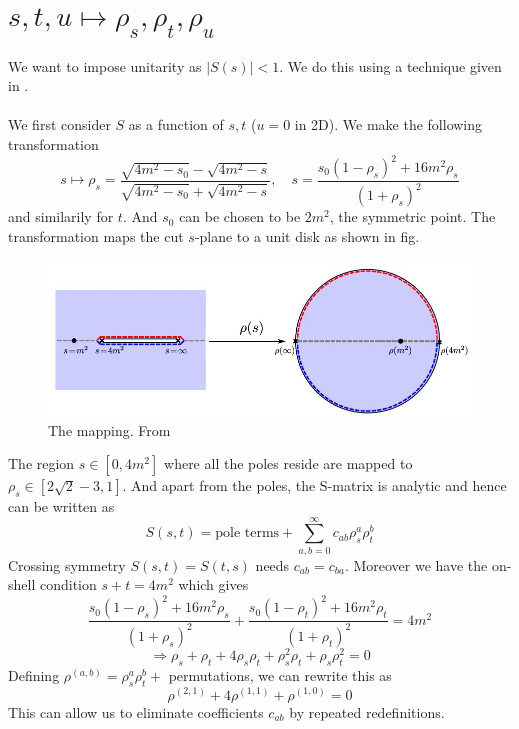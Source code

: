 ﻿\documentclass[12pt,a4paper]{article}
\begin{document}
\newpage
\appendix





\section{$s,t,u \mapsto \rho_{s},\rho_{t},\rho_{u}$}
We want to impose unitarity as $|S(s)|<1$. We do this using a technique given in \cite{5} . \\\\
We first consider $S$ as a function of $s,t$ ($u=0$ in 2D). We make the following transformation
$$
s \mapsto \rho_{s}=\frac{\sqrt{4 m^{2}-s_{0}}-\sqrt{4 m^{2}-s}}{\sqrt{4 m^{2}-s_{0}}+\sqrt{4 m^{2}-s}}, \quad s=\frac{s_{0}\left(1-\rho_{s}\right)^{2}+16 m^{2} \rho_{s}}{\left(1+\rho_{s}\right)^{2}}
$$
and similarily for $t$. And $s_{0}$ can be chosen to be $2m^{2}$, the symmetric point. The transformation maps the cut $s$-plane to a unit disk as shown in fig.  
\begin{figure}[H]
  \centering
  \includegraphics[width=\linewidth]{2.jpg}
  \caption{The mapping. From \cite{5}}
  \label{fig:1}
\end{figure}
The region $s \in\left[0,4 m^{2}\right]$ where all the poles reside are mapped to $\rho_{s} \in[2 \sqrt{2}-3,1]$. And apart from the poles, the S-matrix is analytic and hence can be written as 
$$
S(s, t)=\text{pole terms}+\sum_{a, b=0}^{\infty} c_{a b} \rho_{s}^{a} \rho_{t}^{b}
$$
Crossing symmetry $S(s,t)=S(t,s)$ needs $c_{a b}=c_{b a}$. Moreover we have the on-shell condition $s+t=4m^{2}$ which gives 
$$
\frac{s_{0}\left(1-\rho_{s}\right)^{2}+16 m^{2} \rho_{s}}{\left(1+\rho_{s}\right)^{2}}+\frac{s_{0}\left(1-\rho_{t}\right)^{2}+16 m^{2} \rho_{t}}{\left(1+\rho_{t}\right)^{2}}=4m^{2}
$$
$$
\Rightarrow \rho_{s}+\rho_{t}+4 \rho_{s} \rho_{t}+ \rho_{s}^{2} \rho_{t}+\rho_{s} \rho_{t}^{2}=0
$$
Defining $\rho^{(a, b)}=\rho_{s}^{a} \rho_{t}^{b}+$ permutations, we can rewrite this as
$$\rho^{(2,1)}+4 \rho^{(1,1)}+\rho^{(1,0)}=0$$
This can allow us to eliminate coefficients $c_{a b}$ by repeated redefinitions.\\\\
\end{document}
